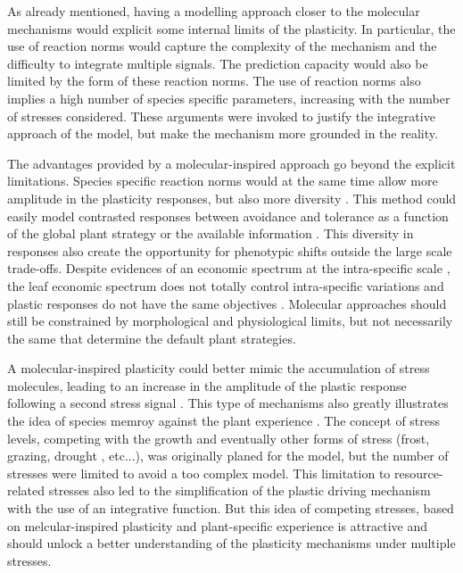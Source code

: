 As already mentioned, having a modelling approach closer to the molecular mechanisms would explicit some internal limits of the plasticity. In particular, the use of reaction norms would capture the complexity of the mechanism and the difficulty to integrate multiple signals. The prediction capacity would also be limited by the form of these reaction norms. The use of reaction norms also implies a high number of species specific parameters, increasing with the number of stresses considered. These arguments were invoked to justify the integrative approach of the model, but make the mechanism more grounded in the reality.

The advantages provided by a molecular-inspired approach go beyond the explicit limitations. Species specific reaction norms would at the same time allow more amplitude in the plasticity responses, but also more diversity \parencite{kichenin_contrasting_2013, wellstein_intraspecific_2013}. This method could easily model contrasted responses between avoidance and tolerance as a function of the global plant strategy \parencite{perez-ramos_tradeoffs_2013} or the available information \parencite{heger_light_2016}. This diversity in responses also create the opportunity for phenotypic shifts outside the large scale trade-offs. Despite evidences of an economic spectrum at the intra-specific scale \parencite{hu_novel_2015, fajardo_intraspecific_2018}, the leaf economic spectrum does not totally control intra-specific variations \parencite{fajardo_intraspecific_2018} and plastic responses do not have the same objectives \parencite{ryser_consequences_2000}. Molecular approaches should still be constrained by morphological and physiological limits, but not necessarily the same that determine the default plant strategies.

A molecular-inspired plasticity could better mimic the accumulation of stress molecules, leading to an increase in the amplitude of the plastic response following a second stress signal \parencite{crisp_reconsidering_2016}. This type of mechanisms also greatly illustrates the idea of species memroy against the plant experience . The concept of stress levels, competing with the growth \parencite{herms_dilemma_1992} and eventually other forms of stress (frost, grazing, drought , etc...), was originally planed for the model, but the number of stresses were limited to avoid a too complex model. This limitation to resource-related stresses also led to the simplification of the plastic driving mechanism with the use of an integrative function. But this idea of competing stresses, based on melcular-inspired plasticity and plant-specific experience is attractive and should unlock a better understanding of the plasticity mechanisms under multiple stresses.

